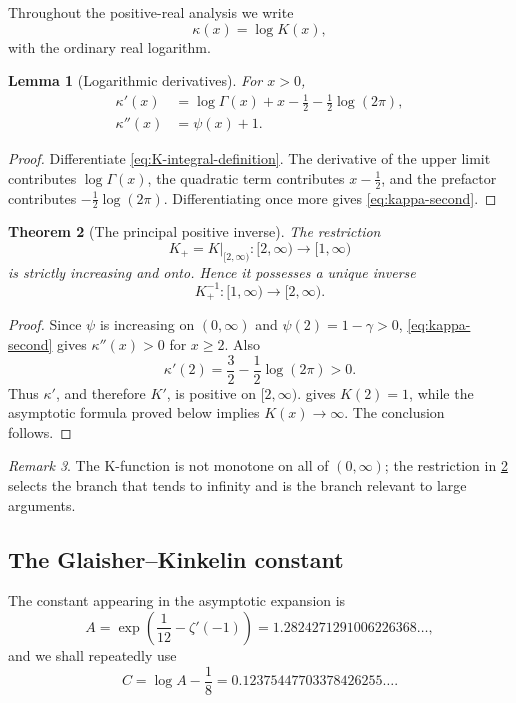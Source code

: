\documentclass[11pt,a4paper]{article}
\numberwithin{equation}{section}
\newtheorem{theorem}{Theorem}[section]
\newtheorem{lemma}[theorem]{Lemma}
\theoremstyle{remark}
\newtheorem{remark}[theorem]{Remark}
\newcommand{\Kinv}{K_{+}^{-1}}
\begin{document}
Throughout the positive-real analysis we write
\[
\kappa(x)=\log K(x),
\]
with the ordinary real logarithm.

\begin{lemma}[Logarithmic derivatives]
For \(x>0\),
\begin{align}
\kappa'(x)
 &=\log\Gamma(x)+x-\frac12-\frac12\log(2\pi),
\label{eq:kappa-prime}\\
\kappa''(x)&=\psi(x)+1.
\label{eq:kappa-second}
\end{align}
\end{lemma}

\begin{proof}
Differentiate \cref{eq:K-integral-definition}.  The derivative of the upper
limit contributes \(\log\Gamma(x)\), the quadratic term contributes
\(x-\tfrac12\), and the prefactor contributes
\(-\tfrac12\log(2\pi)\).  Differentiating once more gives
\cref{eq:kappa-second}.
\end{proof}

\begin{theorem}[The principal positive inverse]
\label{thm:positive-inverse}
The restriction
\[
K_+=K|_{[2,\infty)}:[2,\infty)\longrightarrow[1,\infty)
\]
is strictly increasing and onto.  Hence it possesses a unique inverse
\[
\Kinv:[1,\infty)\longrightarrow[2,\infty).
\]
\end{theorem}

\begin{proof}
Since \(\psi\) is increasing on \((0,\infty)\) and
\(\psi(2)=1-\gamma>0\), \cref{eq:kappa-second} gives
\(\kappa''(x)>0\) for \(x\ge2\).  Also
\[
\kappa'(2)=\frac32-\frac12\log(2\pi)>0.
\]
Thus \(\kappa'\), and therefore \(K'\), is positive on \([2,\infty)\).
 gives \(K(2)=1\), while the asymptotic formula
proved below implies \(K(x)\to\infty\).  The conclusion follows.
\end{proof}

\begin{remark}
The K-function is not monotone on all of \((0,\infty)\); the restriction in
\cref{thm:positive-inverse} selects the branch that tends to infinity and is
the branch relevant to large arguments.
\end{remark}

\subsection{The Glaisher--Kinkelin constant}

The constant appearing in the asymptotic expansion is
\begin{equation}
A=\exp\!\left(\frac1{12}-\zeta'(-1)\right)
 =1.2824271291006226368\ldots,
\label{eq:glaisher}
\end{equation}
and we shall repeatedly use
\begin{equation}
C=\log A-\frac18
 =0.12375447703378426255\ldots.
\label{eq:C}
\end{equation}
\end{document}
